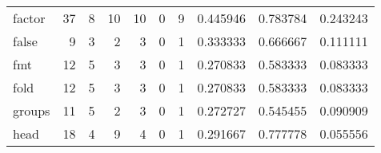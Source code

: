 \begin{tabular}{lrrrrrrrrr}
factor    &                                      37 &                                                  8 &                                                 10 &                                                 10 &                                                  0 &                                                  9 &                                           0.445946 &                               0.783784 &                             0.243243 \\
false     &                                       9 &                                                  3 &                                                  2 &                                                  3 &                                                  0 &                                                  1 &                                           0.333333 &                               0.666667 &                             0.111111 \\
fmt       &                                      12 &                                                  5 &                                                  3 &                                                  3 &                                                  0 &                                                  1 &                                           0.270833 &                               0.583333 &                             0.083333 \\
fold      &                                      12 &                                                  5 &                                                  3 &                                                  3 &                                                  0 &                                                  1 &                                           0.270833 &                               0.583333 &                             0.083333 \\
groups    &                                      11 &                                                  5 &                                                  2 &                                                  3 &                                                  0 &                                                  1 &                                           0.272727 &                               0.545455 &                             0.090909 \\
head      &                                      18 &                                                  4 &                                                  9 &                                                  4 &                                                  0 &                                                  1 &                                           0.291667 &                               0.777778 &                             0.055556 \\

\end{tabular}
